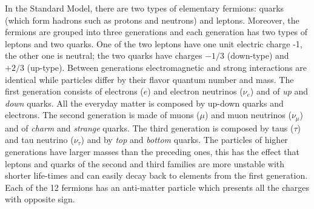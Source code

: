 In the Standard Model, there are two types of elementary fermions: quarks (which form hadrons such as protons and neutrons) and leptons. 
Moreover, the fermions are grouped into three generations and each generation has two types of leptons and two quarks. One of the two leptons have one unit electric charge -1, the other one is neutral; the two quarks have charges $-1/3$ (down-type) and $+2/3$ (up-type). Between generations electromagnetic and strong interactions are identical while particles differ by their flavor quantum number and mass.  The first generation consists of electrons ($e$) and electron neutrinos ($\nu_e$) and of \emph{up} and \emph{down} quarks. All the everyday matter is composed by up-down quarks and electrons. The second generation is made of muons ($\mu$) and muon neutrinos ($\nu_\mu$) and of \emph{charm} and \emph{strange} quarks. The third generation is composed by taus ($\tau$) and tau neutrino ($\nu_\tau$) and by \emph{top} and \emph{bottom} quarks. The particles of higher generations have larger masses than the preceding ones, this has the effect that leptons and quarks of the second and third families are more unstable with shorter life-times and can easily decay back to elements from the first generation.\\
Each of the 12 fermions has an anti-matter particle which presents all the charges with opposite sign.

